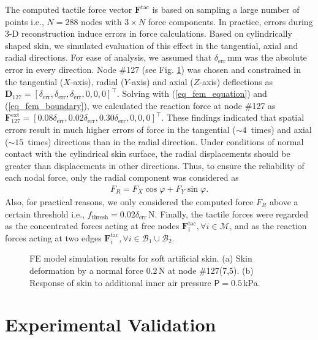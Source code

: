 \documentclass[10pt,letterpaper,journal,final,twoside,twocolumn,nofonttune]{IEEEtran}
\begin{document}
The computed tactile force vector $\mathbf{F}^{\text{tac}}$ is based on sampling a large number of points i.e., $N=288$ nodes with $3\times{N}$ force components. In practice, errors during 3-D reconstruction induce errors in force calculations. Based on cylindrically shaped skin, we simulated evaluation of this effect in the tangential, axial and radial directions. For ease of analysis, we assumed that $\delta_{\text{err}}\,$mm was the absolute error in every direction. Node \#127 (see Fig. \ref{fig_simulation}) was chosen and constrained in the tangential ($X$-axis), radial ($Y$-axis) and axial ($Z$-axis) deflections as $\mathbf{D}_{127} = \left [\delta_{\text{err}},\delta_{\text{err}},\delta_{\text{err}},0,0,0\right]^\top$. Solving with (\ref{eq_fem_equation}) and (\ref{eq_fem_boundary}), we calculated the reaction force at node \#127 as  $\mathbf{F}^{\text{ext}}_{127} = \left [0.08\delta_{\text{err}},0.02\delta_{\text{err}},0.30\delta_{\text{err}},0,0,0\right]^\top$. These findings indicated that spatial errors result in much higher errors of force in the tangential ($\sim{4}\,$ times) and axial ($\sim{15}\,$ times) directions than in the radial direction. Under conditions of normal contact with the cylindrical skin surface, the radial displacements should be greater than displacements in other directions. Thus, to ensure the reliability of each nodal force, only the radial component was considered as
\begin{align}
\label{eq_fem_nforce}
F_R= F_X\cos\varphi + F_Y\sin\varphi.
\end{align}
Also, for practical reasons, we only considered the computed force $F_R$ above a certain threshold i.e., $f_\text{thresh}= 0.02\delta_{\text{err}}$\,N. Finally, the tactile forces were regarded as the concentrated forces acting at free nodes $\mathbf{F}^{\text{tac}}_i,\forall i \in \mathcal{M}$, and as the reaction forces acting at two edges $\mathbf{F}^{\text{tac}}_i,\forall i \in \mathcal{B}_1 \cup \mathcal{B}_2$.
\begin{figure}[!t]
\def\svgwidth{\columnwidth}

\caption{FE model simulation results for soft artificial skin. (a) Skin deformation by a normal force $0.2$\,N at node \#127(7,5). (b) Response of skin to additional inner air pressure $\mathsf{P}=0.5$\,kPa.}
\label{fig_simulation}
\end{figure}
\section{Experimental Validation}
\end{document}
